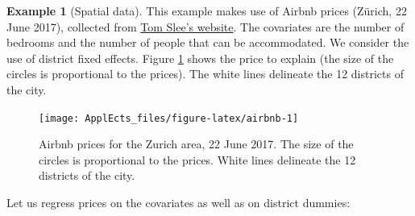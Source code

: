 \documentclass[
  12pt,
]{book}
\theoremstyle{definition}
\theoremstyle{definition}
\newtheorem{example}{Example}[chapter]
\theoremstyle{definition}
\theoremstyle{definition}
\theoremstyle{remark}
\begin{document}
\begin{example}[Spatial data]
\protect\hypertarget{exm:airbnb}{}\label{exm:airbnb}This example makes use of Airbnb prices (Zürich, 22 June 2017), collected from \href{http://tomslee.net/airbnb-data-collection-get-the-data}{Tom Slee's website}. The covariates are the number of bedrooms and the number of people that can be accommodated. We consider the use of district fixed effects. Figure \ref{fig:airbnb} shows the price to explain (the size of the circles is proportional to the prices). The white lines delineate the 12 districts of the city.

\begin{figure}
\texttt{[image: ApplEcts\_files/figure-latex/airbnb-1]} \caption{Airbnb prices for the Zurich area, 22 June 2017. The size of the circles is proportional to the prices. White lines delineate the 12 districts of the city.}\label{fig:airbnb}
\end{figure}

Let us regress prices on the covariates as well as on district dummies:


\end{example}
\end{document}
